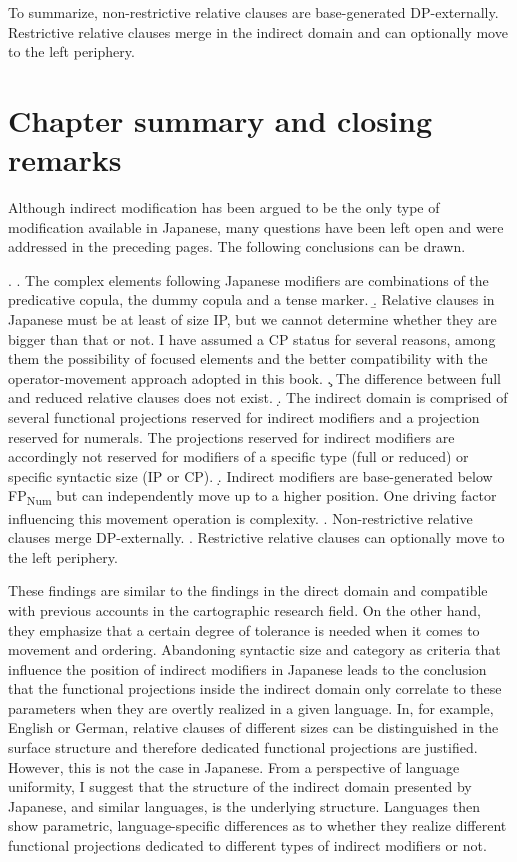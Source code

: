 To summarize, non-restrictive relative clauses are base-generated DP-externally. Restrictive relative clauses merge in the indirect domain and can optionally move to the left periphery.

\section{Chapter summary and closing remarks}

Although indirect modification has been argued to be the only type of modification available in Japanese, many questions have been left open and were addressed in the preceding pages. The following conclusions can be drawn.

\ex. \a. The complex elements following Japanese modifiers are combinations of the predicative copula, the dummy copula and a tense marker.
\b. Relative clauses in Japanese must be at least of size IP, but we cannot determine whether they are bigger than that or not. I have assumed a CP status for several reasons, among them the possibility of focused elements and the better compatibility with the operator-movement approach adopted in this book.
\c. The difference between full and reduced relative clauses does not exist.
\d. The indirect domain is comprised of several functional projections reserved for indirect modifiers and a projection reserved for numerals. The projections reserved for indirect modifiers are accordingly not reserved for modifiers of a specific type (full or reduced) or specific syntactic size (IP or CP).
\d. Indirect modifiers are base-generated below FP\textsubscript{Num} but can independently move up to a higher position. One driving factor influencing this movement operation is complexity.
\e. Non-restrictive relative clauses merge DP-externally.
\e. Restrictive relative clauses can optionally move to the left periphery.

These findings are similar to the findings in the direct domain and compatible with previous accounts in the cartographic research field. On the other hand, they emphasize that a certain degree of tolerance is needed when it comes to movement and ordering. Abandoning syntactic size and category as criteria that influence the position of indirect modifiers in Japanese leads to the conclusion that the functional projections inside the indirect domain only correlate to these parameters when they are overtly realized in a given language. In, for example, English or German, relative clauses of different sizes can be distinguished in the surface structure and therefore dedicated functional projections are justified. However, this is not the case in Japanese. From a perspective of language uniformity, I suggest that the structure of the indirect domain presented by Japanese, and similar languages, is the underlying structure. Languages then show parametric, language-specific differences as to whether they realize different functional projections dedicated to different types of indirect modifiers or not.

